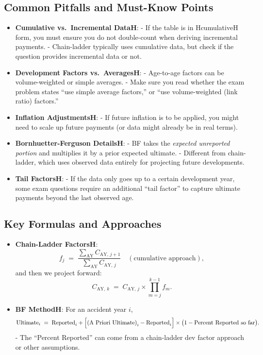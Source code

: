 \documentclass[13pt,a4paper]{article}
\begin{document}
\subsection{Common Pitfalls and Must-Know Points}
\begin{itemize}
  \item \textbf{Cumulative vs.\ Incremental DataH}:
    - If the table is in HcumulativeH form, you must ensure you do not double-count when deriving incremental payments.  
    - Chain-ladder typically uses cumulative data, but check if the question provides incremental data or not.
  \item \textbf{Development Factors vs.\ AveragesH}:
    - Age-to-age factors can be volume-weighted or simple averages. 
    - Make sure you read whether the exam problem states “use simple average factors,” or “use volume-weighted (link ratio) factors.”
  \item \textbf{Inflation AdjustmentsH}:
    - If future inflation is to be applied, you might need to scale up future payments (or data might already be in real terms).
  \item \textbf{Bornhuetter-Ferguson DetailsH}:
    - BF takes the \emph{expected unreported portion} and multiplies it by a prior expected ultimate.  
    - Different from chain-ladder, which uses observed data entirely for projecting future developments.
  \item \textbf{Tail FactorsH}:
    - If the data only goes up to a certain development year, some exam questions require an additional “tail factor” to capture ultimate payments beyond the last observed age.
\end{itemize}

\subsection{Key Formulas and Approaches}
\begin{itemize}
  \item \textbf{Chain-Ladder FactorsH}:
    \[
      f_j \;=\; \frac{\sum_{\text{AY}} C_{\text{AY},\,j+1}}{\sum_{\text{AY}} C_{\text{AY},\,j}}
      \quad (\text{cumulative approach}),
    \]
    and then we project forward:
    \[
      C_{\text{AY},\,k} \;=\; C_{\text{AY},\,j} \times \prod_{m=j}^{k-1} f_m.
    \]
  \item \textbf{BF MethodH}: For an accident year \(i\),
    \[
      \text{Ultimate}_i 
      \;=\; \text{Reported}_i + \Bigl[\text{(A Priori Ultimate)}_i - \text{Reported}_i\Bigr]\times \bigl(1 - \text{Percent Reported so far}\bigr).
    \]
    - The “Percent Reported” can come from a chain-ladder dev factor approach or other assumptions.
\end{itemize}
\end{document}
